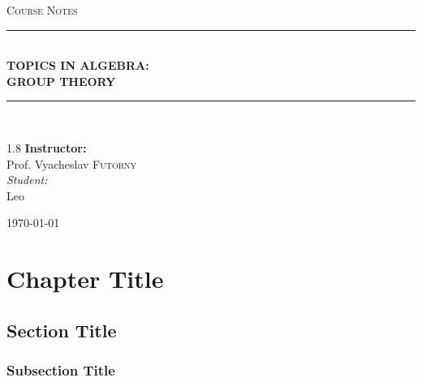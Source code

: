 \documentclass[11pt, a4paper]{report}
\newcommand{\HRule}[1]{\rule{\linewidth}{#1}}
\begin{document}
\begin{titlepage}
    \centering
    \vspace*{2cm}
    
    \textsc{\Large Course Notes}\\[0.5cm]

    \HRule{1.5pt} \\[0.5cm]
    { \huge \bfseries TOPICS IN ALGEBRA: \\[0.3cm] GROUP THEORY }\\[0.4cm] 
    \HRule{1.5pt} \\[1.5cm]
    
    \vspace{3cm}

    \begin{spacing}{1.8}
        {\Large \textbf{Instructor:}} \\
        {\Large Prof. Vyacheslav \textsc{Futorny}} \\[0.8cm]
        
        {\normalsize \textit{Student:}} \\
        {\normalsize Leo}
    \end{spacing}

    \vfill
    {\large \today}
\end{titlepage}
\newpage
\tableofcontents
\newpage


\chapter{Chapter Title}
\section{Section Title}
\subsection{Subsection Title}
\end{document}
